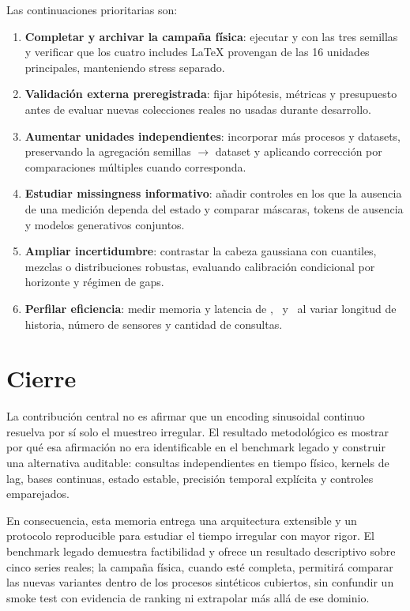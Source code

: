 Las continuaciones prioritarias son:
\begin{enumerate}
    \item \textbf{Completar y archivar la campaña física}: ejecutar  y  con las tres semillas y verificar que los cuatro includes LaTeX provengan de las 16 unidades principales, manteniendo stress separado.
    \item \textbf{Validación externa preregistrada}: fijar hipótesis, métricas y presupuesto antes de evaluar nuevas colecciones reales no usadas durante desarrollo.
    \item \textbf{Aumentar unidades independientes}: incorporar más procesos y datasets, preservando la agregación semillas $\rightarrow$ dataset y aplicando corrección por comparaciones múltiples cuando corresponda.
    \item \textbf{Estudiar missingness informativo}: añadir controles en los que la ausencia de una medición dependa del estado y comparar máscaras, tokens de ausencia y modelos generativos conjuntos.
    \item \textbf{Ampliar incertidumbre}: contrastar la cabeza gaussiana con cuantiles, mezclas o distribuciones robustas, evaluando calibración condicional por horizonte y régimen de gaps.
    \item \textbf{Perfilar eficiencia}: medir memoria y latencia de \QueryCross, \ContinuousBasis\ y \CTSSM\ al variar longitud de historia, número de sensores y cantidad de consultas.
\end{enumerate}

\section{Cierre}
\label{sec:cierre-memoria}

La contribución central no es afirmar que un encoding sinusoidal continuo resuelva por sí solo el muestreo irregular. El resultado metodológico es mostrar por qué esa afirmación no era identificable en el benchmark legado y construir una alternativa auditable: consultas independientes en tiempo físico, kernels de lag, bases continuas, estado estable, precisión temporal explícita y controles emparejados.

En consecuencia, esta memoria entrega una arquitectura extensible y un protocolo reproducible para estudiar el tiempo irregular con mayor rigor. El benchmark legado demuestra factibilidad y ofrece un resultado descriptivo sobre cinco series reales; la campaña física, cuando esté completa, permitirá comparar las nuevas variantes dentro de los procesos sintéticos cubiertos, sin confundir un smoke test con evidencia de ranking ni extrapolar más allá de ese dominio.

